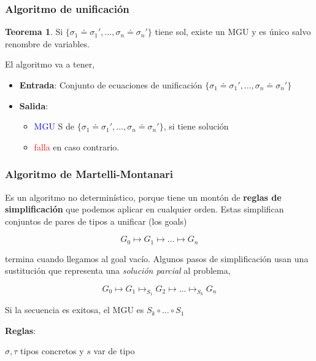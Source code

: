 \documentclass{report}
\theoremstyle{definition} %
\newtheorem{theorem}{Teorema}[chapter]
\newcommand{\changed}[1]{\textcolor{red}{#1}}
\newcommand{\select}[1]{\textcolor{blue}{#1}}
\newcommand{\comp}[2]{#1 \circ #2}
\newcommand{\unify}[2]{#1 \doteq #2}
\newcommand{\unifySetD}{\{
    \unify{\sigma_1}{\sigma_1'},
    \dots,
    \unify{\sigma_n}{\sigma_n'} 
\}}
\newcommand{\simpSust}[1]{\mapsto_{#1}}
\newcommand{\simp}{\mapsto}
\begin{document}
\subsubsection{Algoritmo de unificación}

\begin{theorem}
    Si $\unifySetD$ tiene sol, existe un MGU y es único salvo renombre de variables.
\end{theorem}
 
El algoritmo va a tener,

\begin{itemize}
    \item \textbf{Entrada}: Conjunto de ecuaciones de unificación $\unifySetD$
    \item \textbf{Salida}:
    \begin{itemize}
        \item \select{MGU} S de $\unifySetD$, si tiene solución
        \item \changed{falla} en caso contrario.
    \end{itemize}
\end{itemize}

\subsubsection{Algoritmo de Martelli-Montanari}

Es un algoritmo no determinístico, porque tiene un montón de \textbf{reglas de
simplificación} que podemos aplicar en cualquier orden. Estas simplifican
conjuntos de pares de tipos a unificar (los goals)

\[G_0 \simp G_1 \simp \dots \simp G_n \]

termina cuando llegamos al goal vacío. Algunos pasos de simplificación usan una
sustitución que representa una \textit{solución parcial} al problema,

\[
    G_0 \simp G_1
    \simpSust{S_1} G_2
    \simp \dots
    \simpSust{S_k} G_n
\]

Si la secuencia es exitosa, el MGU es $\comp{S_k}{\comp{\dots}{S_1}}$

\textbf{Reglas}:

$\sigma, \tau$ tipos concretos y $s$ var de tipo
\end{document}
